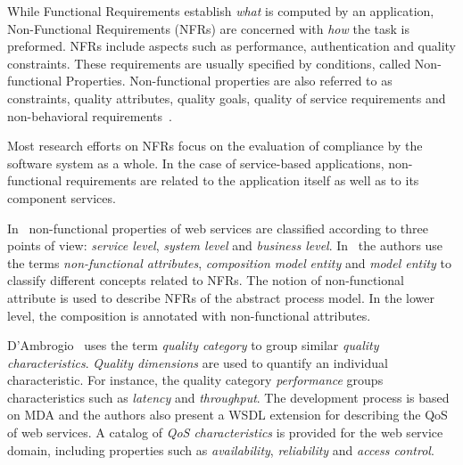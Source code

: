 While Functional Requirements establish \textit{what} is computed by an application, Non-Functional Requirements (NFRs) are concerned with \textit{how} the task is preformed.  
NFRs include aspects such as performance, authentication and quality constraints.
These requirements are usually specified by conditions, called Non-functional Properties.
Non-functional properties are also referred to as constraints, quality attributes, quality goals, quality of service requirements and non-behavioral requirements~\cite{Chung91,MylopoulosBook99,Chung2009}.

Most research  efforts on NFRs focus on the evaluation of compliance by the software system as a whole. %
In the case of service-based applications, non-functional requirements are related to the application itself as well as to its component services. 

In~\cite{Babamir2010,Yeom2006} non-functional properties of web services are classified according to three points of view:   
\textit{service level}, \textit{system level} and \textit{business level}.
In~\cite{XiaoCZBOLH08} the authors use the terms  
\textit{non-functional attributes}, \textit{composition mo\-del}  \textit{entity} and \textit{mo\-del entity}  to classify different concepts related to NFRs.
The notion of non-functional attribute is used to describe NFRs of the abstract process model. 
In the lower level, the composition is annotated with non-functional attributes.

D'Ambrogio~\cite{DAmbrogio06} uses the term \textit{quality category} to group similar \textit{quality characteristics}. 
\textit{Quality dimensions} are used to quantify an individual characteristic.
For instance, the quality category \textit{performance} groups characteristics such as
\textit{latency} and \textit{throughput}. 
The development process is based on MDA and the authors also present a WSDL extension for describing the QoS of web services. A catalog of \textit{QoS characteristics} is provided for the web service domain, including properties such as \textit{availability}, \textit{reliability} and \textit{access control}. 

